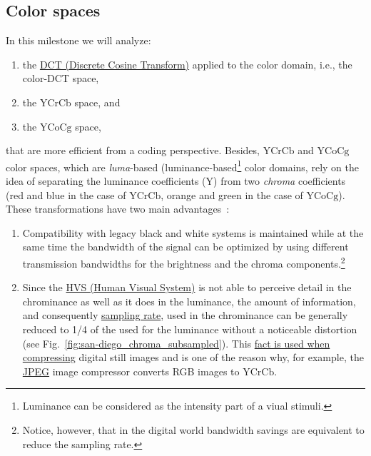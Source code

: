 
\subsection{Color spaces}

In this milestone we will analyze:
\begin{enumerate}
\item the
  \href{https://en.wikipedia.org/wiki/Discrete_cosine_transform}{DCT
    (Discrete Cosine Transform)} applied to the color domain, i.e.,
  the color-DCT space,
\item the \href{https://en.wikipedia.org/wiki/YCbCr}{$\text{YCrCb}$} space, and
\item the \href{https://en.wikipedia.org/wiki/YCoCg}{$\text{YCoCg}$} space,
\end{enumerate}
that are more efficient from a coding perspective. Besides,
$\text{YCrCb}$ and $\text{YCoCg}$ color spaces, which are
\emph{luma}-based (luminance-based\footnote{Luminance can be
considered as the intensity part of a viual stimuli.} color domains,
rely on the idea of separating the luminance coefficients (Y) from two
\emph{chroma} coefficients (red and blue in the case of
$\text{YCrCb}$, orange and green in the case of $\text{YCoCg}$). These
transformations have two main advantages~\cite{burger2016digital}:
\begin{enumerate}
\item Compatibility with legacy black and white systems is maintained
  while at the same time the bandwidth of the signal can be optimized
  by using diﬀerent transmission bandwidths for the brightness and the
  chroma components.\footnote{Notice, however, that in the digital
  world bandwidth savings are equivalent to reduce the sampling rate.}
\item Since the \href{https://en.wikipedia.org/wiki/Visual_system}{HVS
  (Human Visual System)} is not able to perceive detail in the
  chrominance as well as it does in the luminance, the amount of
  information, and consequently
  \href{https://en.wikipedia.org/wiki/Sampling_(signal_processing)}{sampling
    rate}, used in the chrominance can be generally reduced to 1/4
  of the used for the luminance without a noticeable distortion (see
  Fig.~\ref{fig:san-diego_chroma_subsampled}). This
  \href{https://en.wikipedia.org/wiki/Bandwidth_(computing)}{fact is
    used when compressing} digital still images and is one of the
  reason why, for example, the
  \href{https://en.wikipedia.org/wiki/JPEG}{JPEG} image compressor
  converts RGB images to $\text{YCrCb}$.
\end{enumerate}

